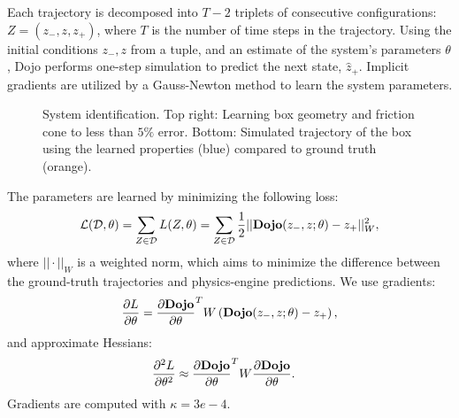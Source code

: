 Each trajectory is decomposed into $T-2$ triplets of consecutive configurations: $Z = (z_{-}, z, z_{+})$, where $T$ is the number of time steps in the trajectory. Using the initial conditions $z_{-}, z$ from a tuple, and an estimate of the system's parameters $\theta$, Dojo performs one-step simulation to predict the next state, $\hat{z}_{+}$. Implicit gradients are utilized by a Gauss-Newton method to learn the system parameters.

\begin{figure}[t]
	\begin{center}
	\end{center}
	
	\caption[Learned friction parameters and contact geometry for box (top). Real-to-sim simulation for learned box parameters (bottom)]{System identification. Top right: Learning box geometry and friction cone to less than $5\%$ error. Bottom: Simulated trajectory of the box using the learned properties (blue) compared to ground truth (orange).}
	\label{dojo_real2sim}
\end{figure}

The parameters are learned by minimizing the following loss: 
\begin{align}
	\mathcal{L}(\mathcal{D}, \theta) = \sum_{Z \in \mathcal{D}} L(Z, \theta) = \sum_{Z \in \mathcal{D}} \frac{1}{2} ||\mbox{\textbf{Dojo}}(z_{-}, z; \theta) - z_{+}||_W^2,
\end{align}
where $||\cdot||_W$ is a weighted norm, which aims to minimize the difference between the ground-truth trajectories and physics-engine predictions. We use gradients:
\begin{equation}
	\frac{\partial L}{\partial \theta} = {\frac{\partial \mbox{\textbf{Dojo}}}{\partial \theta}}^T W \left(\mbox{\textbf{Dojo}}(z_{-}, z; \theta) - z_{+} \right),
\end{equation}
and approximate Hessians: 
\begin{align}
	\frac{\partial^2 L}{\partial \theta^2} &\approx {\frac{\partial \mbox{\textbf{Dojo}}}{\partial \theta}}^T W \frac{\partial \mbox{\textbf{Dojo}}}{\partial \theta}.
\end{align}
Gradients are computed with $\kappa = 3e{-}4$.

